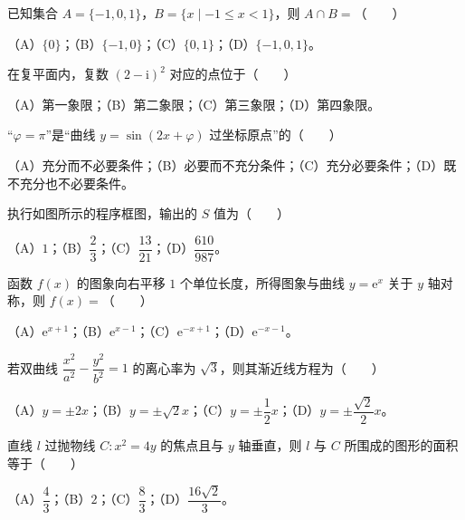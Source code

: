 \begin{question}
已知集合 $A=\{-1,0,1\}$，$B=\{x\mid-1\leqslant x<1\}$，则 $A\cap B=$\mbox{（　　）}

（A）$\{0\}$；（B）$\{-1,0\}$；（C）$\{0,1\}$；（D）$\{-1,0,1\}$。

\end{question}
\begin{question}
在复平面内，复数 $(2-\mathrm i)^2$ 对应的点位于\mbox{（　　）}

（A）第一象限；（B）第二象限；（C）第三象限；（D）第四象限。

\end{question}
\begin{question}
“$\varphi=\pi$”是“曲线 $y=\sin(2x+\varphi)$ 过坐标原点”的\mbox{（　　）}

（A）充分而不必要条件；（B）必要而不充分条件；（C）充分必要条件；（D）既不充分也不必要条件。

\Needspace{0.4\textheight}
\end{question}
\begin{question}
执行如图所示的程序框图，输出的 $S$ 值为\mbox{（　　）}
\nopagebreak[4]
\begin{center}\end{center}
\nopagebreak[4]
（A）$1$；（B）$\dfrac23$；（C）$\dfrac{13}{21}$；（D）$\dfrac{610}{987}$。

\end{question}
\begin{question}
函数 $f(x)$ 的图象向右平移 $1$ 个单位长度，所得图象与曲线 $y=\mathrm e^x$ 关于 $y$ 轴对称，则 $f(x)=$\mbox{（　　）}

（A）$\mathrm e^{x+1}$；（B）$\mathrm e^{x-1}$；（C）$\mathrm e^{-x+1}$；（D）$\mathrm e^{-x-1}$。

\end{question}
\begin{question}
若双曲线 $\dfrac{x^2}{a^2}-\dfrac{y^2}{b^2}=1$ 的离心率为 $\sqrt3$，则其渐近线方程为\mbox{（　　）}

（A）$y=\pm2x$；（B）$y=\pm\sqrt2x$；（C）$y=\pm\dfrac12x$；（D）$y=\pm\dfrac{\sqrt2}2x$。

\end{question}
\begin{question}
直线 $l$ 过抛物线 $C:x^2=4y$ 的焦点且与 $y$ 轴垂直，则 $l$ 与 $C$ 所围成的图形的面积等于\mbox{（　　）}

（A）$\dfrac43$；（B）$2$；（C）$\dfrac83$；（D）$\dfrac{16\sqrt2}3$。

\end{question}

